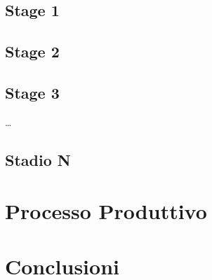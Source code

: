 \documentclass{article}
\begin{document}
        \subsection{Stage 1\label{Stage_1}}
        \subsection{Stage 2\label{Stage_2}}
        \subsection{Stage 3\label{Stage_3}}
        \dots
        \subsection{Stadio N}
        \pagebreak

    \section{Processo Produttivo\label{product_process}}

    \pagebreak

    \section{Conclusioni\label{conclusioni}}

    \pagebreak

    \printbibliography
    
\end{document}
